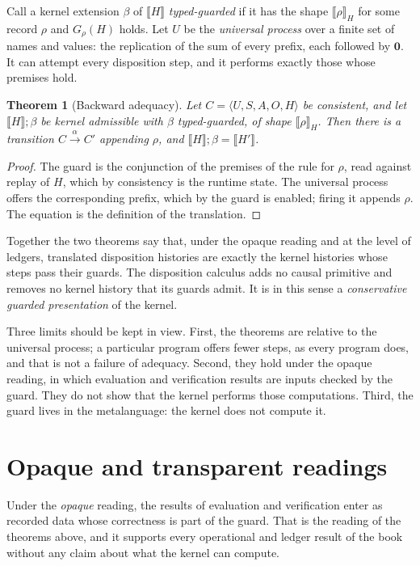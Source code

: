 \documentclass[11pt,openany]{book}
\newtheorem{theorem}{Theorem}[chapter]
\theoremstyle{remark}
\begin{document}
Call a kernel extension $\beta$ of $\llbracket H\rrbracket$
\emph{typed-guarded} if it has the shape $\llbracket\rho\rrbracket_H$ for
some record $\rho$ and $G_\rho(H)$ holds. Let $U$ be the \emph{universal
process} over a finite set of names and values: the replication of the
sum of every prefix, each followed by $\mathbf 0$. It can attempt every
disposition step, and it performs exactly those whose premises hold.

\begin{theorem}[Backward adequacy]\label{thm:bwd}
Let $C=\langle U,S,A,O,H\rangle$ be consistent, and let
$\llbracket H\rrbracket;\beta$ be kernel admissible with $\beta$
typed-guarded, of shape $\llbracket\rho\rrbracket_H$. Then there is a
transition $C\xrightarrow{\alpha}C'$ appending $\rho$, and
$\llbracket H\rrbracket;\beta=\llbracket H'\rrbracket$.
\end{theorem}

\begin{proof}
The guard is the conjunction of the premises of the rule for $\rho$, read
against replay of $H$, which by consistency is the runtime state. The
universal process offers the corresponding prefix, which by the guard is
enabled; firing it appends $\rho$. The equation is the definition of the
translation.
\end{proof}

Together the two theorems say that, under the opaque reading and at the
level of ledgers, translated disposition histories are exactly the kernel
histories whose steps pass their guards. The disposition calculus adds no
causal primitive and removes no kernel history that its guards admit. It
is in this sense a \emph{conservative guarded presentation} of the kernel.

Three limits should be kept in view. First, the theorems are relative to
the universal process; a particular program offers fewer steps, as every
program does, and that is not a failure of adequacy. Second, they hold
under the opaque reading, in which evaluation and verification results are
inputs checked by the guard. They do not show that the kernel performs
those computations. Third, the guard lives in the metalanguage: the kernel
does not compute it.

\section{Opaque and transparent readings}

Under the \emph{opaque} reading, the results of evaluation and
verification enter as recorded data whose correctness is part of the
guard. That is the reading of the theorems above, and it supports every
operational and ledger result of the book without any claim about what
the kernel can compute.
\end{document}
